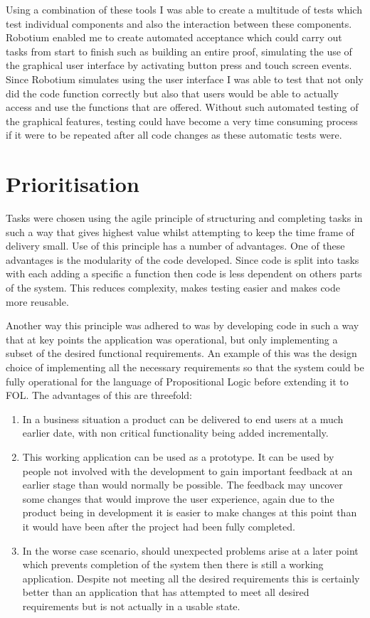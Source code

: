 Using a combination of these tools I was able to create a multitude of tests which test individual components and also the interaction between these components. Robotium enabled me to create automated acceptance which could carry out tasks from start to finish such as building an entire proof, simulating the use of the graphical user interface by activating button press and touch screen events. Since Robotium simulates using the user interface I was able to test that not only did the code function correctly but also that users would be able to actually access and use the functions that are offered. Without such automated testing of the graphical features, testing could have become  a very time consuming process if it were to be repeated after all code changes as these automatic tests were.





\section{Prioritisation}

Tasks were chosen using the agile principle of structuring and completing tasks in such a way that gives highest value whilst attempting to keep the time frame of delivery small. Use of this principle has a number of advantages. One of these advantages is the modularity of the code developed. Since code is split into tasks with each adding a specific a function then code is less dependent on others parts of the system. This reduces complexity, makes testing easier and makes code more reusable. 

Another way this principle was adhered to was by developing code in such a way that at key points the application was operational, but only implementing a subset of the desired functional requirements. An example of this was the design choice of implementing all the necessary requirements so that the system could be fully operational for the language of Propositional Logic before extending it to FOL. The advantages of this are threefold:
\begin{enumerate}
\item In a business situation a product can be delivered to end users at a much earlier date, with non critical functionality being added incrementally.
\item This working application can be used as a prototype. It can be used by people not involved with the development to gain important feedback at an earlier stage than would normally be possible. The feedback may uncover some changes that would improve the user experience, again due to the product being in development it is easier to make changes at this point than it would have been after the project had been fully completed.
\item In the worse case scenario, should unexpected problems arise at a later point which prevents completion of the system then there is still a working application. Despite not meeting all the desired requirements this is certainly better than an application that has attempted to meet all desired requirements but is not actually in a usable state.
\end{enumerate}


